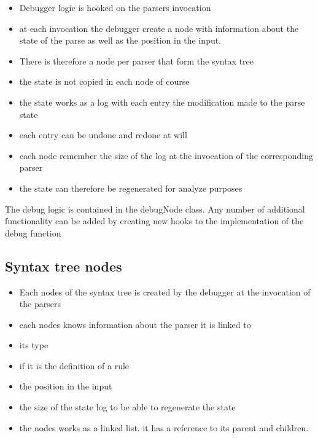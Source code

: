 \begin{itemize}
	\item Debugger logic is hooked on the parsers invocation
	\item at each invocation the debugger create a node with information about the state of the parse as well as the position in the input.
	\item There is therefore a node per parser that form the syntax tree
	\item the state is not copied in each node of course
	\item the state works as a log with each entry the modification made to the parse state
	\item each entry can be undone and redone at will
	\item each node remember the size of the log at the invocation of the corresponding parser
	\item the state can therefore be regenerated for analyze purposes
\end{itemize}

The debug logic is contained in the debugNode class. Any number of additional functionality can be added by creating new hooks to the implementation of the debug function
%
		\subsection{Syntax tree nodes}
%

\begin{itemize}
	\item Each nodes of the syntax tree is created by the debugger at the invocation of the parsers
	\item each nodes knows information about the parser it is linked to
	\item its type
	\item if it is the definition of a rule
	\item the position in the input
	\item the size of the state log to be able to regenerate the state
	\item the nodes works as a linked list. it has a reference to its parent and children.
\end{itemize}



